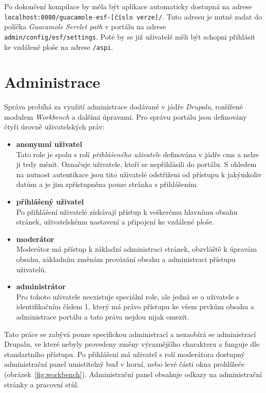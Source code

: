 Po dokončení kompilace by měla být aplikace automaticky dostupná na adrese \texttt{localhost:8080/guacamole-esf-[číslo verze]/}. Tuto adresu je nutné zadat do políčka \emph{Guacamole Servlet path} v portálu na adrese \\ \texttt{admin/config/esf/settings}. Poté by se již uživatelé měli být schopni přihlásit ke vzdálené ploše na adrese \texttt{/aspi}.

\section{Administrace}
\label{sec:administrace}
Správa probíhá za využití administrace dodávané v jádře \emph{Drupalu}, rozšířené modulem \emph{Workbench} a dalšími úpravami. Pro správu portálu jsou definovány čtyři úrovně uživatelských práv:

\begin{itemize}
  \item \textbf{anonymní uživatel} \hfill \\
    Tato role je spolu s rolí \emph{přihlášeného uživatele} definována v jádře \gls{cms} a nelze ji tedy měnit. Označuje uživatele, kteří se nepřihlásili do portálu. S ohledem na nutnost autentikace jsou tito uživatelé odstřiženi od přístupu k jakýmkoliv datům a je jim zpřístupněna pouze stránka s přihlášením.
  \item \textbf{přihlášený uživatel} \hfill \\
    Po přihlášení uživatelé získávají přístup k veškerému hlavnímu obsahu stránek, uživatelskému nastavení a připojení ke vzdálené ploše. 
  \item \textbf{moderátor} \hfill \\
    Moderátor má přístup k základní administraci stránek, obzvláště k úpravám obsahu, základním změnám provázání obsahu a administraci přístupu uživatelů.
  \item \textbf{administrátor} \hfill \\
    Pro tohoto uživatele neexistuje speciální role, ale jedná se o uživatele s identifikačním číslem 1, který má právo přístupu ke všem prvkům obsahu a administrace portálu a tato práva nejdou nijak omezit.
\end{itemize}

Tato práce se zabývá pouze specifickou administrací a nezaobírá se administrací Drupalu, ve které nebyly provedeny změny výraznějšího charakteru a funguje dle standartního přístupu. Po přihlášení má uživatel s rolí moderátora dostupný administrační panel umistitelný buď v horní, nebo levé části okna prohlížeče (obrázek~\ref{fig:workbench}). Administrační panel obsahuje odkazy na administrační stránky a pracovní stůl. 

